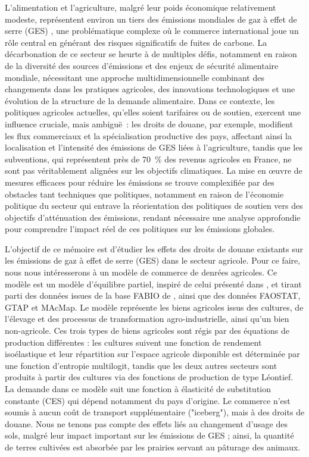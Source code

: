 L'alimentation et l'agriculture, malgré leur poids économique relativement modeste, représentent environ un tiers des émissions mondiales de gaz à effet de serre (GES) \cite{Crippa2021}, une problématique complexe où le commerce international joue un rôle central en générant des risques significatifs de fuites de carbone. La décarbonation de ce secteur se heurte à de multiples défis, notamment en raison de la diversité des sources d'émissions et des enjeux de sécurité alimentaire mondiale, nécessitant une approche multidimensionnelle combinant des changements dans les pratiques agricoles, des innovations technologiques et une évolution de la structure de la demande alimentaire. Dans ce contexte, les politiques agricoles actuelles, qu'elles soient tarifaires ou de soutien, exercent une influence cruciale, mais ambiguë~: les droits de douane, par exemple, modifient les flux commerciaux et la spécialisation productive des pays, affectant ainsi la localisation et l'intensité des émissions de GES liées à l'agriculture, tandis que les subventions, qui représentent près de 70~\% des revenus agricoles en France, ne sont pas véritablement alignées sur les objectifs climatiques. La mise en œuvre de mesures efficaces pour réduire les émissions se trouve complexifiée par des obstacles tant techniques que politiques, notamment en raison de l'économie politique du secteur qui entrave la réorientation des politiques de soutien vers des objectifs d'atténuation des émissions, rendant nécessaire une analyse approfondie pour comprendre l'impact réel de ces politiques sur les émissions globales.

L'objectif de ce mémoire est d'étudier les effets des droits de douane existants sur les émissions de gaz à effet de serre (GES) dans le secteur agricole. Pour ce faire, nous nous intéresserons à un modèle de commerce de denrées agricoles. Ce modèle est un modèle d'équilibre partiel, inspiré de celui présenté dans \cite{Gouel2021}, et tirant parti des données issues de la base FABIO de \cite{Bruckner2019}, ainsi que des données FAOSTAT, GTAP et MAcMap. Le modèle représente les biens agricoles issus des cultures, de l'élevage et des processus de transformation agro-industrielle, ainsi qu'un bien non-agricole. Ces trois types de biens agricoles sont régis par des équations de production différentes : les cultures suivent une fonction de rendement isoélastique et leur répartition sur l'espace agricole disponible est déterminée par une fonction d'entropie multilogit, tandis que les deux autres secteurs sont produits à partir des cultures via des fonctions de production de type Léontief. La demande dans ce modèle suit une fonction à élasticité de substitution constante (CES) qui dépend notamment du pays d'origine. Le commerce n'est soumis à aucun coût de transport supplémentaire ("iceberg"), mais à des droits de douane. Nous ne tenons pas compte des effets liés au changement d'usage des sols, malgré leur impact important sur les émissions de GES ; ainsi, la quantité de terres cultivées est absorbée par les prairies servant au pâturage des animaux.

